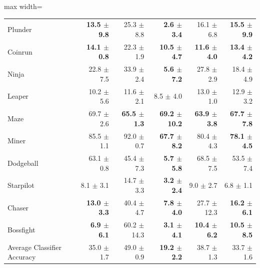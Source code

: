 \begin{table}[!htb]
\begin{center}
\begin{small}
\begin{sc}
\begin{adjustbox}{max width=\linewidth}
\begin{tabular}{lrrrrr}
                    Plunder &  \textbf{13.5 $\pm$ 9.8} &          25.3 $\pm$ 8.8 &   \textbf{2.6 $\pm$ 3.4} &                    16.1 $\pm$ 6.8 &           \textbf{15.5 $\pm$ 9.9} \\
                    Coinrun &  \textbf{14.1 $\pm$ 0.8} &          22.3 $\pm$ 1.9 &  \textbf{10.5 $\pm$ 4.7} &           \textbf{11.6 $\pm$ 4.0} &           \textbf{13.4 $\pm$ 4.2} \\
                      Ninja &           22.8 $\pm$ 7.5 &          33.9 $\pm$ 2.4 &   \textbf{5.6 $\pm$ 7.2} &                    27.8 $\pm$ 2.9 &                    18.4 $\pm$ 4.9 \\
                     Leaper &           10.2 $\pm$ 5.6 &          11.6 $\pm$ 2.1 &            8.5 $\pm$ 4.0 &                    13.0 $\pm$ 1.0 &                    12.9 $\pm$ 3.2 \\
                       Maze &           69.7 $\pm$ 2.6 & \textbf{65.5 $\pm$ 1.3} & \textbf{69.2 $\pm$ 10.2} &           \textbf{63.9 $\pm$ 3.8} &           \textbf{67.7 $\pm$ 7.8} \\
                      Miner &           85.5 $\pm$ 1.1 &          92.0 $\pm$ 0.7 &  \textbf{67.7 $\pm$ 8.2} &                    80.4 $\pm$ 4.3 &           \textbf{78.1 $\pm$ 4.5} \\
                  Dodgeball &           63.1 $\pm$ 0.8 &          45.4 $\pm$ 7.3 &   \textbf{5.7 $\pm$ 5.8} &                    68.5 $\pm$ 7.5 &                    53.5 $\pm$ 7.4 \\
                  Starpilot &            8.1 $\pm$ 3.1 &          14.7 $\pm$ 3.3 &   \textbf{3.2 $\pm$ 2.4} &                     9.0 $\pm$ 2.7 &                     6.8 $\pm$ 1.1 \\
                     Chaser &  \textbf{13.0 $\pm$ 3.3} &          40.4 $\pm$ 4.7 &   \textbf{7.8 $\pm$ 4.0} &                   27.7 $\pm$ 12.3 &           \textbf{16.2 $\pm$ 6.1} \\
                  Bossfight &   \textbf{6.9 $\pm$ 6.1} &         60.2 $\pm$ 14.3 &   \textbf{3.1 $\pm$ 4.1} &           \textbf{10.4 $\pm$ 6.2} &           \textbf{10.5 $\pm$ 8.5} \\
\midrule
Average Classifier Accuracy &           35.0 $\pm$ 1.7 &          49.0 $\pm$ 0.9 &  \textbf{19.2 $\pm$ 2.2} &                    38.7 $\pm$ 1.3 &                    33.7 $\pm$ 1.6 \\
\bottomrule
\end{tabular}
\end{adjustbox}
\end{sc}
\end{small}
\end{center}
\vskip -0.1in
\end{table}

